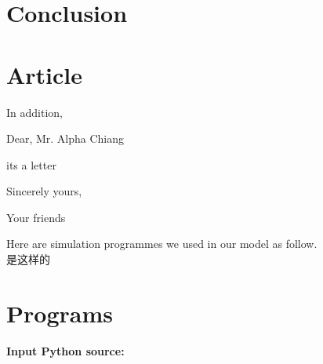 \documentclass{mcmthesis}
\begin{document}
\section{Conclusion}

{}



\begin{appendices}

\section{Article}

In addition, 

\begin{letter}{Dear, Mr. Alpha Chiang}

its a letter

\vspace{\parskip}

Sincerely yours,

Your friends

\end{letter}
Here are simulation programmes we used in our model as follow.\\
是这样的


\section{Programs}
\textbf{\textcolor[rgb]{0.98,0.00,0.00}{Input Python source:}}

\end{appendices}
\end{document}
